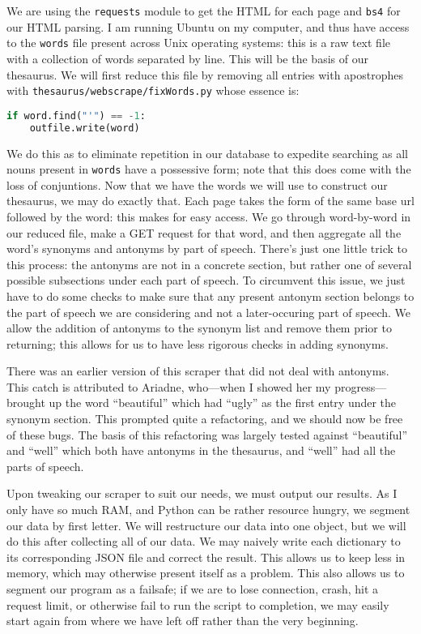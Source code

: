 \documentclass[11pt, twoside, reqno]{book}
\begin{document}
We are using the \texttt{requests} module to get the HTML for each page and \texttt{bs4} for our HTML parsing. I am running Ubuntu on my computer, and thus have access to the \texttt{words} file present across Unix operating systems: this is a raw text file with a collection of words separated by line. This will be the basis of our thesaurus. We will first reduce this file by removing all entries with apostrophes with \texttt{thesaurus/webscrape/fixWords.py} whose essence is:
\begin{lstlisting}[language=Python]
if word.find("'") == -1:
    outfile.write(word)
\end{lstlisting}

We do this as to eliminate repetition in our database to expedite searching as all nouns present in \texttt{words} have a possessive form; note that this does come with the loss of conjuntions. Now that we have the words we will use to construct our thesaurus, we may do exactly that. Each page takes the form of the same base url followed by the word: this makes for easy access. We go through word-by-word in our reduced file, make a GET request for that word, and then aggregate all the word's synonyms and antonyms by part of speech. There's just one little trick to this process: the antonyms are not in a concrete section, but rather one of several possible subsections under each part of speech. To circumvent this issue, we just have to do some checks to make sure that any present antonym section belongs to the part of speech we are considering and not a later-occuring part of speech. We allow the addition of antonyms to the synonym list and remove them prior to returning; this allows for us to have less rigorous checks in adding synonyms.

There was an earlier version of this scraper that did not deal with antonyms. This catch is attributed to Ariadne, who—when I showed her my progress—brought up the word ``beautiful'' which had ``ugly'' as the first entry under the synonym section. This prompted quite a refactoring, and we should now be free of these bugs. The basis of this refactoring was largely tested against ``beautiful'' and ``well'' which both have antonyms in the thesaurus, and ``well'' had all the parts of speech.

Upon tweaking our scraper to suit our needs, we must output our results. As I only have so much RAM, and Python can be rather resource hungry, we segment our data by first letter. We will restructure our data into one object, but we will do this after collecting all of our data. We may naively write each dictionary to its corresponding JSON file and correct the result. This allows us to keep less in memory, which may otherwise present itself as a problem. This also allows us to segment our program as a failsafe; if we are to lose connection, crash, hit a request limit, or otherwise fail to run the script to completion, we may easily start again from where we have left off rather than the very beginning.
\end{document}
